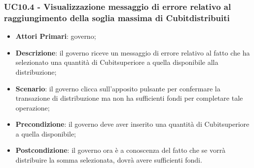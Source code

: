 \subsubsection{UC10.4 - Visualizzazione messaggio di errore relativo al raggiungimento della soglia massima di Cubit\glosp distribuiti}
\begin{itemize}
	\item \textbf{Attori Primari}: governo;
	\item \textbf{Descrizione}: il governo riceve un messaggio di errore relativo al fatto che ha selezionato una quantità di Cubit\glosp superiore a quella disponibile alla distribuzione;
	\item \textbf{Scenario}: il governo clicca sull'apposito pulsante per confermare la transazione di distribuzione ma non ha sufficienti fondi per completare tale operazione;
	\item \textbf{Precondizione}: il governo deve aver inserito una quantità di Cubit\glosp superiore a quella disponibile;
	\item \textbf{Postcondizione}: il governo ora è a conoscenza del fatto che se vorrà distribuire la somma selezionata, dovrà avere sufficienti fondi.
	
\end{itemize} 
